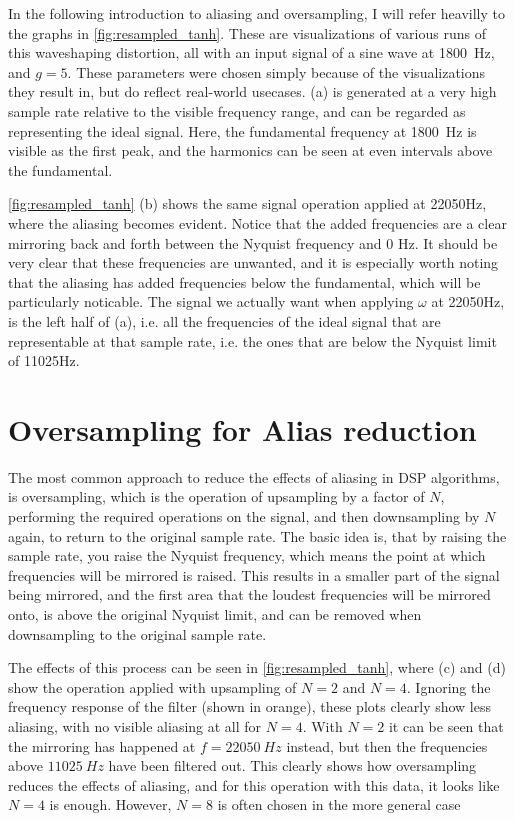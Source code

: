 In the following introduction to aliasing and oversampling, I will refer heavilly to the graphs in
\autoref{fig:resampled_tanh}. These are visualizations of various runs of this waveshaping distortion, all with an
input signal of a sine wave at \SI{1800}{Hz}, and $g = 5$. These parameters were
chosen simply because of the visualizations they result in, but do reflect real-world usecases. (a) is
generated at a very high sample rate relative to the visible frequency range, and can be regarded as
representing the ideal signal. Here, the fundamental frequency at \SI{1800}{Hz} is visible as the
first peak, and the harmonics can be seen at even intervals above the fundamental.

\autoref{fig:resampled_tanh} (b) shows the same signal operation applied at 22050Hz, where the aliasing becomes
evident. Notice that the added frequencies are a clear mirroring back and forth between the Nyquist frequency
and 0 Hz. It should be very clear that these frequencies are unwanted, and it is especially worth noting that
the aliasing has added frequencies below the fundamental, which will be particularly noticable. The signal we
actually want when applying $\omega$ at 22050Hz, is the left half of (a), i.e. all the
frequencies of the ideal signal that are representable at that sample rate, i.e. the ones that are below the
Nyquist limit of 11025Hz.

\section{Oversampling for Alias reduction}
The most common approach to reduce the effects of aliasing in DSP algorithms, is oversampling, which is the
operation of upsampling by a factor of $N$, performing the required operations on the
signal, and then downsampling by $N$ again, to return to the original sample rate. The
basic idea is, that by raising the sample rate, you raise the Nyquist frequency, which means the point at
which frequencies will be mirrored is raised. This results in a smaller part of the signal being mirrored,
and the first area that the loudest frequencies will be mirrored onto, is above the original Nyquist limit,
and can be removed when downsampling to the original sample rate.

The effects of this process can be seen in \autoref{fig:resampled_tanh}, where (c) and (d) show the operation
applied with upsampling of $N = 2$ and $N = 4$. Ignoring the frequency response
of the filter (shown in orange), these plots clearly show less aliasing, with no visible aliasing at all for
$N = 4$. With $N = 2$ it can be seen that the mirroring has happened at
$f = \SI{22050}{Hz}$ instead, but then the frequencies above $\SI{11025}{Hz}$ have been filtered out.
This clearly shows how oversampling reduces the effects of aliasing, and for this operation with this data,
it looks like $N = 4$ is enough. However, $N = 8$ is often chosen in the more
general case \autocite{kahles2019oversampling}

